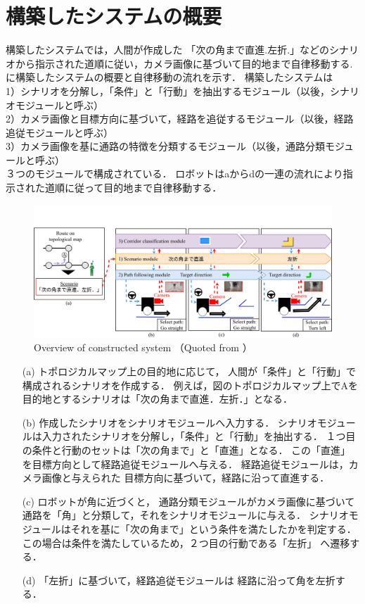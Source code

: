 \section{構築したシステムの概要}
構築したシステムでは，人間が作成した
「次の角まで直進.左折.」などのシナリオから指示された道順に従い，カメラ画像に基づいて目的地まで自律移動する.
に構築したシステムの概要と自律移動の流れを示す．
構築したシステムは\\
1）シナリオを分解し，「条件」と「行動」を抽出するモジュール（以後，シナリオモジュールと呼ぶ）\\
2）カメラ画像と目標方向に基づいて，経路を追従するモジュール（以後，経路追従モジュールと呼ぶ）\\
3）カメラ画像を基に通路の特徴を分類するモジュール（以後，通路分類モジュールと呼ぶ）\\
３つのモジュールで構成されている．
ロボットはaからdの一連の流れにより指示された道順に従って目的地まで自律移動する．
\vspace{3zh}
\begin{figure}[htbp]
    \centering
     \includegraphics[width=130mm]{images/pdf/absv3.pdf}
     \caption{Overview of constructed system （Quoted from \cite{haruyama2023}）}\label{fig:abs}
\end{figure}
\begin{enumerate}
    \item [(a)] トポロジカルマップ上の目的地に応じて，
    人間が「条件」と「行動」で構成されるシナリオを作成する．
    例えば，図のトポロジカルマップ上でAを目的地とするシナリオは「次の角まで直進．左折．」となる．
    \item [(b)] 作成したシナリオをシナリオモジュールへ入力する．
    シナリオモジュールは入力されたシナリオを分解し，「条件」と「行動」を抽出する．
    １つ目の条件と行動のセットは「次の角まで」と「直進」となる．
    この「直進」を目標方向として経路追従モジュールへ与える．
    経路追従モジュールは，カメラ画像と与えられた
    目標方向に基づいて，経路に沿って直進する．
    \item [(c)] ロボットが角に近づくと，
    通路分類モジュールがカメラ画像に基づいて
    通路を「角」と分類して，それをシナリオモジュールに与える．
    シナリオモジュールはそれを基に「次の角まで」という条件を満たしたかを判定する．
    この場合は条件を満たしているため，２つ目の行動である「左折」
    へ遷移する．
    \item [(d)]「左折」に基づいて，経路追従モジュールは
    経路に沿って角を左折する．
\end{enumerate}

